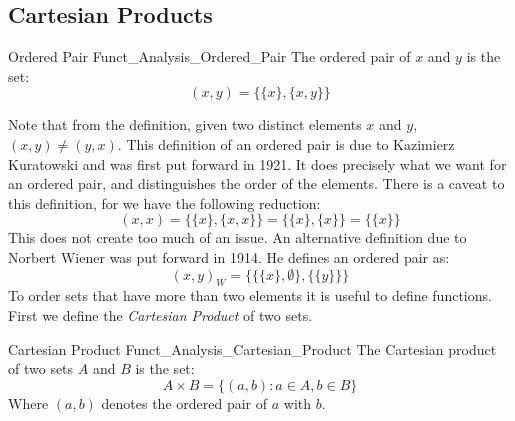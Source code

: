 \documentclass[crop=false,class=book,oneside]{standalone}
\begin{document}
        \subsection{Cartesian Products}
            \begin{ldefinition}{Ordered Pair}
                  {Funct_Analysis_Ordered_Pair}
                The \gls{ordered pair} of $x$ and $y$ is the set:
                \begin{equation}
                    (x,y)=\big\{\{x\},\{x,y\}\big\}
                \end{equation}
            \end{ldefinition}
            Note that from the definition, given two distinct
            elements $x$ and $y$, $(x,y)\ne(y,x)$. This definition
            of an ordered pair is due to Kazimierz Kuratowski
            and was first put forward in 1921. It does precisely
            what we want for an ordered pair, and distinguishes
            the order of the elements. There is a caveat to this
            definition, for we have the following reduction:
            \begin{equation}
                (x,x)=\big\{\{x\},\{x,x\}\big\}
                =\big\{\{x\},\{x\}\big\}
                =\big\{\{x\}\big\}
            \end{equation}
            This does not create too much of an issue. An
            alternative definition due to Norbert Wiener was put
            forward in 1914. He defines an ordered pair as:
            \begin{equation}
                (x,y)_{W}=\Big\{\big\{\{x\},\emptyset\big\},
                    \big\{\{y\}\big\}\Big\}
            \end{equation}
            To order sets that have more than two elements it is
            useful to define functions. First we define the
            \textit{Cartesian Product} of two sets.
            \begin{ldefinition}{Cartesian Product}
                  {Funct_Analysis_Cartesian_Product}
                The \gls{Cartesian product} of two sets $A$
                and $B$ is the set:
                \begin{equation}
                    A\times{B}=\{(a,b):a\in{A},b\in{B}\}
                \end{equation}
                Where $(a,b)$ denotes the ordered pair of
                $a$ with $b$.
            \end{ldefinition}
\end{document}
